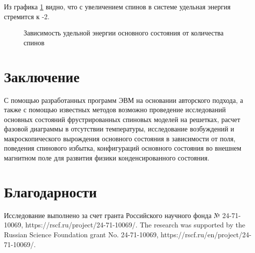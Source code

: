 \documentclass[utf8, babel, sor, jor, amsmath, amssymb, reprint]{elsarticle} %
\begin{document}
Из графика \ref{fig:Egs____N_F} видно, что с увеличением спинов в системе удельная энергия стремится к -2.

\begin{figure}[H]
	\centering
	\caption{Зависимость удельной энергии основного состояния от количества спинов}
	\label{fig:Egs____N_F}
\end{figure}

\section{Заключение}

С помощью разработанных программ ЭВМ на основании авторского подхода, а также с помощью известных методов возможно проведение исследований основных состояний фрустрированных спиновых моделей на решетках, расчет фазовой диаграммы в отсутствии температуры, исследование возбуждений и макроскопического вырождения основного состояния в зависимости от поля, поведения спинового избытка, конфигураций основного состояния во внешнем магнитном поле для развития физики конденсированного состояния.


\section{Благодарности}

Исследование выполнено за счет гранта Российского научного фонда № 24-71-10069, https://rscf.ru/project/24-71-10069/.
The research was supported by the Russian Science Foundation grant No. 24-71-10069, https://rscf.ru/en/project/24-71-10069/.


\end{document}
